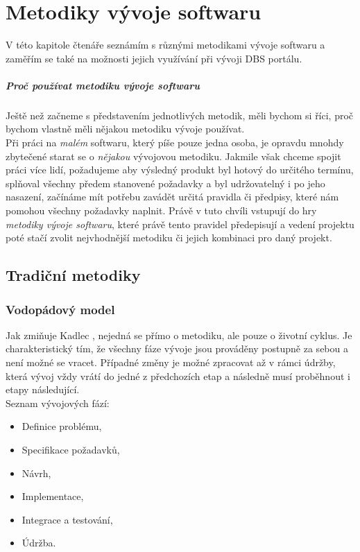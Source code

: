 \chapter{Metodiky vývoje softwaru} \label{methods}

V této kapitole čtenáře seznámím s různými metodikami vývoje softwaru a zaměřím se také na možnosti jejich využívání při vývoji DBS portálu.

\paragraph{Proč používat metodiku vývoje softwaru}
Ještě než začneme s představením jednotlivých metodik, měli bychom si říci, proč bychom vlastně měli nějakou metodiku vývoje používat.\\
Při práci na \emph{malém} softwaru, který píše pouze jedna osoba, je opravdu mnohdy zbytečené starat se o \emph{nějakou} vývojovou metodiku. Jakmile však chceme spojit práci více lidí, požadujeme aby výsledný produkt byl hotový do určitého termínu, splňoval všechny předem stanovené požadavky a byl udržovatelný i po jeho nasazení, začínáme mít potřebu zavádět určitá pravidla či předpisy, které nám pomohou všechny požadavky naplnit. Právě v tuto chvíli vstupují do hry \emph{metodiky vývoje softwaru}, které právě tento  pravidel předepisují a vedení projektu poté stačí zvolit nejvhodnější metodiku či jejich kombinaci pro daný projekt.

\section{Tradiční metodiky} \label{methods:traditional}

\subsection{Vodopádový model} \label{methods:waterfall}

Jak zmiňuje Kadlec \cite{kadlec}, nejedná se přímo o metodiku, ale pouze o životní cyklus. Je charakteristický tím, že všechny fáze vývoje jsou prováděny postupně za sebou a není možné se vracet. Případné změny je možné zpracovat až v rámci údržby, která vývoj vždy vrátí do jedné z předchozích etap a následně musí proběhnout i etapy následující.\\
Seznam vývojových fází:
\begin{itemize}
	\item Definice problému,
	\item Specifikace požadavků,
	\item Návrh,
	\item Implementace,
	\item Integrace a testování,
	\item Údržba.
\end{itemize}

